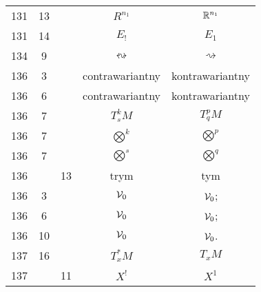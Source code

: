\documentclass[a4paper,11pt]{article}
\begin{document}
\begin{center}
\begin{tabular}{|c|c|c|c|c|}
    131 & 13 & & $R^{ n_{ 1 } }$ & $\mathbb{R}^{ n_{ 1 } }$ \\
    131 & 14 & & $E_{ ! }$ & $E_{ 1 }$ \\
    134 &  9 & & $\leftrightsquigarrow$ & $\rightsquigarrow$ \\
    136 &  3 & & contrawariantny & kontrawariantny \\
    136 &  6 & & contrawariantny & kontrawariantny \\
    136 &  7 & & $T^{ k }_{ s }M$ & $T^{ p }_{ q }M$ \\
    136 &  7 & & $\bigotimes^{ k }$ & $\bigotimes^{ p }$ \\
    136 &  7 & & $\bigotimes^{ s }$ & $\bigotimes^{ q }$ \\
    136 & & 13 & trym & tym \\
    136 &  3 & & $\mathcal{V}_{ 0 }$ & $\mathcal{V}_{ 0 }$; \\
    136 &  6 & & $\mathcal{V}_{ 0 }$ & $\mathcal{V}_{ 0 }$; \\
    136 & 10 & & $\mathcal{V}_{ 0 }$ & $\mathcal{V}_{ 0 }$. \\
    137 & 16 & & $T^{ * }_{ x }M$ & $T_{ x }M$ \\
    137 & & 11 & $X^{ ! }$ & $X^{ 1 }$ \\
    \hline
  \end{tabular}






\end{center}
\end{document}
